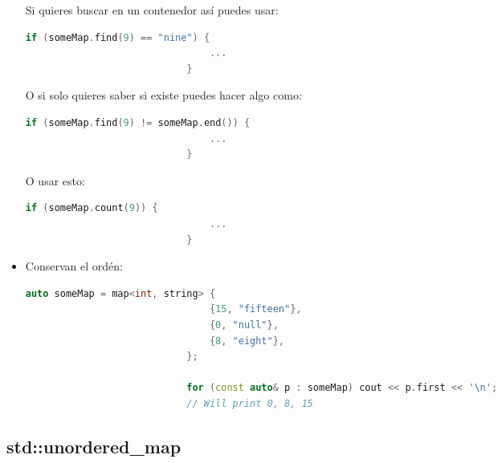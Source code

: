 \documentclass[12pt, fleqn]{report}                             %
\theoremstyle{break}                                            %
\begin{document}
\begin{itemize}
                        Si quieres buscar en un contenedor así puedes usar:
                        \begin{lstlisting}[language=C++, gobble=28]
                            if (someMap.find(9) == "nine") {   
                                ...
                            }
                        \end{lstlisting}

                        O si solo quieres saber si existe puedes hacer algo como:
                        \begin{lstlisting}[language=C++, gobble=28]
                            if (someMap.find(9) != someMap.end()) {   
                                ...
                            }
                        \end{lstlisting}

                        O usar esto:
                        \begin{lstlisting}[language=C++, gobble=28]
                            if (someMap.count(9)) {   
                                ...
                            }
                        \end{lstlisting}

                    \item 
                        Conservan el ordén:
                        \begin{lstlisting}[language=C++, gobble=28]
                            auto someMap = map<int, string> {
                                {15, "fifteen"},
                                {0, "null"},
                                {8, "eight"},
                            };

                            for (const auto& p : someMap) cout << p.first << '\n';
                            // Will print 0, 8, 15
                        \end{lstlisting}
                \end{itemize}


                \subsection{std::unordered\_map}
        


    \clearpage
\end{document}
